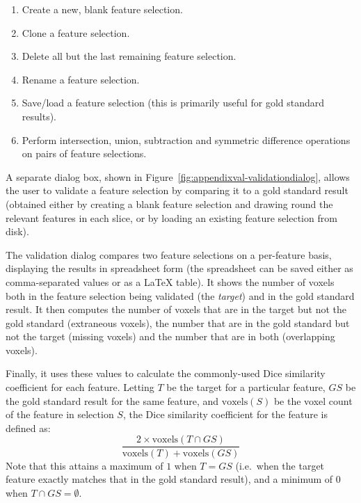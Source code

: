 
\begin{enumerate}
\item Create a new, blank feature selection.
\item Clone a feature selection.
\item Delete all but the last remaining feature selection.
\item Rename a feature selection.
\item Save/load a feature selection (this is primarily useful for gold standard results).
\item Perform intersection, union, subtraction and symmetric difference operations on pairs of feature selections.
\end{enumerate}

\noindent A separate dialog box, shown in Figure~\ref{fig:appendixval-validationdialog}, allows the user to validate a feature selection by comparing it to a gold standard result (obtained either by creating a blank feature selection and drawing round the relevant features in each slice, or by loading an existing feature selection from disk).


The validation dialog compares two feature selections on a per-feature basis, displaying the results in spreadsheet form (the spreadsheet can be saved either as comma-separated values or as a \LaTeX{} table). It shows the number of voxels both in the feature selection being validated (the \emph{target}) and in the gold standard result. It then computes the number of voxels that are in the target but not the gold standard (extraneous voxels), the number that are in the gold standard but not the target (missing voxels) and the number that are in both (overlapping voxels).

\newpage

\noindent Finally, it uses these values to calculate the commonly-used Dice similarity coefficient for each feature. Letting $T$ be the target for a particular feature, $\mathit{GS}$ be the gold standard result for the same feature, and $\mbox{voxels}(S)$ be the voxel count of the feature in selection $S$, the Dice similarity coefficient for the feature is defined as:
%
\[
\frac{2 \times \mbox{voxels}(T \cap \mathit{GS})}{\mbox{voxels}(T) + \mbox{voxels}(\mathit{GS})}
\]
%
Note that this attains a maximum of $1$ when $T = \mathit{GS}$ (i.e.~when the target feature exactly matches that in the gold standard result), and a minimum of $0$ when $T \cap \mathit{GS} = \emptyset$.

